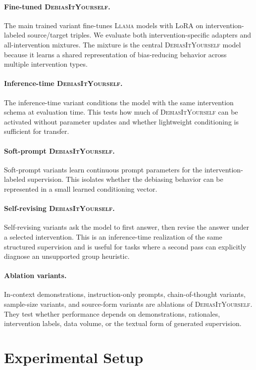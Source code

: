 \documentclass[11pt]{article}
\newcommand{\diy}{\textsc{DebiasItYourself}}
\newcommand{\llama}{\textsc{Llama}}
\begin{document}
\paragraph{Fine-tuned \diy{}.}
The main trained variant fine-tunes \llama{} models with LoRA on intervention-labeled source/target triples. We evaluate both intervention-specific adapters and all-intervention mixtures. The mixture is the central \diy{} model because it learns a shared representation of bias-reducing behavior across multiple intervention types.

\paragraph{Inference-time \diy{}.}
The inference-time variant conditions the model with the same intervention schema at evaluation time. This tests how much of \diy{} can be activated without parameter updates and whether lightweight conditioning is sufficient for transfer.

\paragraph{Soft-prompt \diy{}.}
Soft-prompt variants learn continuous prompt parameters for the intervention-labeled supervision. This isolates whether the debiasing behavior can be represented in a small learned conditioning vector.

\paragraph{Self-revising \diy{}.}
Self-revising variants ask the model to first answer, then revise the answer under a selected intervention. This is an inference-time realization of the same structured supervision and is useful for tasks where a second pass can explicitly diagnose an unsupported group heuristic.

\paragraph{Ablation variants.}
In-context demonstrations, instruction-only prompts, chain-of-thought variants, sample-size variants, and source-form variants are ablations of \diy{}. They test whether performance depends on demonstrations, rationales, intervention labels, data volume, or the textual form of generated supervision.

\section{Experimental Setup}
\label{sec:setup}
\end{document}
